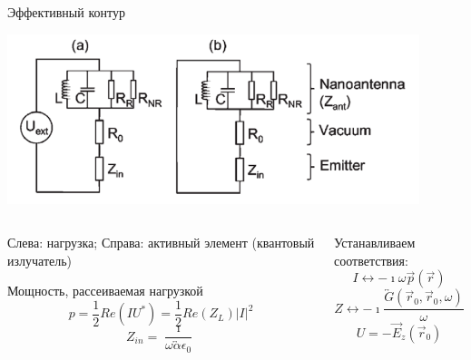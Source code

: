 \documentclass[9pt, compress, xcolor=table]{beamer}
\begin{document}
\begin{frame}{Эффективный контур}
\begin{center}
\includegraphics[width=0.9\textwidth]{optant71}
\end{center}

\begin{columns}
\column{6cm}
\begin{center}
{\scriptsize Слева: нагрузка;
Справа: активный элемент (квантовый излучатель)}

Мощность, рассеиваемая нагрузкой
\begin{equation*}
p=\frac{1}{2}Re(IU^*) = \frac{1}{2}Re(Z_L)|I|^2
\end{equation*}
\begin{equation*}
Z_{in}=\frac{\imath}{\omega \overleftrightarrow \alpha \epsilon_0}
\end{equation*}

\end{center}
\column{6cm}
\begin{center}

Устанавливаем соответствия:
\begin{equation*}
I \leftrightarrow -\imath \omega \vec p(\vec r)
\end{equation*}
\begin{equation*}
Z \leftrightarrow -\imath \frac{\overleftrightarrow G(\vec r_0, \vec r_0,\omega)}{\omega}
\end{equation*}
\begin{equation*}
U=-\vec E_z(\vec r_0)
\end{equation*}
\end{center}
\end{columns}
\end{frame}

\end{document}
